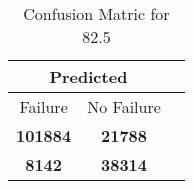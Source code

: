 \begin{table}[] 
\label{Table: Prediction Accuracy-DMD82.5OnlySunEKF-combinationReflection-Reflection} 
\caption{Confusion Matric for 82.5} 
\centering 
\begin{tabular} 
 {@{}ccc@{}} 
\toprule 
\multicolumn{2}{c}{\textbf{Predicted}}
 \\ \midrule 
\multicolumn{1}{|c|}{Failure} & 
\multicolumn{1}{c|}{No Failure}
 \\ \midrule 
\multicolumn{1}{|c|}{\color{green}\textbf{101884}} & 
\multicolumn{1}{c|}{\color{red}\textbf{21788}}
 \\ \midrule 
\multicolumn{1}{|c|}{\color{red}\textbf{8142}} & 
\multicolumn{1}{c|}{\color{green}\textbf{38314}}
 \\ \bottomrule 
\end{tabular} 
\end{table} 

